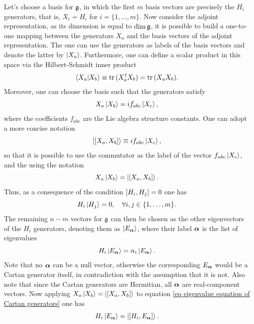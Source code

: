 Let's choose a basis for $\mathfrak{g}$, in which the first $m$ basis vectors are precisely the $H_i$ generators, that is, $X_i = H_i$ for $i = \{1,\dots,m\}$. Now consider the adjoint representation, as its dimension is equal to $\dim{\mathfrak{g}}$, it is possible to build a one-to-one mapping between the generators $X_a$ and the basis vectors of the adjoint representation. The one can use the generators as labels of the basis vectors and denote the latter by $\ket{X_a}$. Furthermore, one can define a scalar product in this space via the Hilbert-Schmidt inner product 
\begin{equation}
    \langle X_a | X_b \rangle \equiv \mathrm{tr}\,{(X_a^\dagger X_b)} = \mathrm{tr}\,{(X_a X_b)}.
\end{equation}
Moreover, one can choose the basis such that the generators satisfy 
\begin{equation}
    X_a\ket{X_b} = if_{abc}\ket{X_c},
\end{equation}
where the coefficients $f_{abc}$ are the Lie algebra structure constants. One can adopt a more concise notation
\begin{equation}
    \ket{[X_a,X_b]} \equiv if_{abc}\ket{X_c},
\end{equation}
so that it is possible to use the commutator as the label of the vector $f_{abc}\ket{X_c}$, and the using the notation
\begin{equation}
    X_a\ket{X_b} = \ket{[X_a,X_b]}.
\end{equation}
Thus, as a consequence of the condition $[H_i,H_j] = 0$ one has
\begin{equation}
    H_i\ket{H_j} = 0,\quad \forall i,j \in \{1,\dots,m\}.
\end{equation}
The remaining $n - m$ vectors for $\mathfrak{g}$ can then be chosen as the other eigenvectors of the $H_i$ generators, denoting them as $\ket{E_{\bm{\alpha}}}$, where their label $\bm{\alpha}$ is the list of eigenvalues
\begin{equation}
\label{eq eigenvalue equation of Cartan generators}
    H_i\ket{E_{\bm{\alpha}}} = \alpha_i\ket{E_{\bm{\alpha}}}.
\end{equation}
Note that no $\bm{\alpha}$ can be a null vector, otherwise the corresponding $E_{\bm{\alpha}}$ would be a Cartan generator itself, in contradiction with the assumption that it is not. Also note that since the Cartan generators are Hermitian, all $\bm{\alpha}$ are real-component vectors. Now applying $X_a\ket{X_b} = \ket{[X_a,X_b]}$ to equation \eqref{eq eigenvalue equation of Cartan generators} one has
\begin{equation}
    H_i\ket{E_{\bm{\alpha}}} = \ket{[H_i,E_{\bm{\alpha}}]}.
\end{equation}
